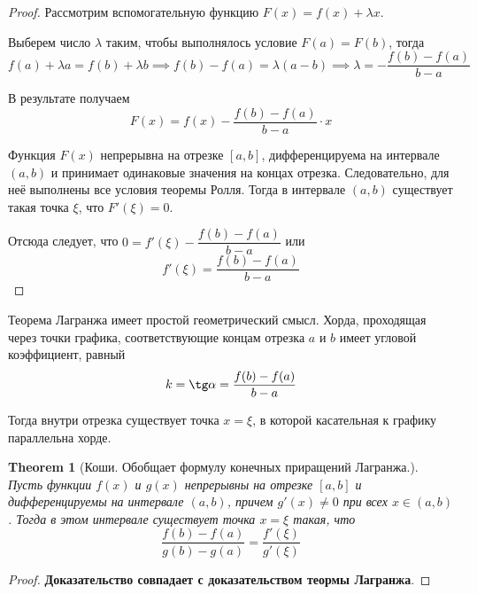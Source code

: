 \documentclass[a4paper]{article}
\theoremstyle{named}
\newtheorem*{namedtheorem}{Theorem}
\begin{document}
\begin{colloq}
		\begin{proof}
			Рассмотрим вспомогательную функцию $F(x) = f(x) + \lambda x$.

			Выберем число $\lambda$ таким, чтобы выполнялось условие $F(a) = F(b)$, тогда
			\begin{equation*}
				f(a) + \lambda a = f(b) + \lambda b 
				\implies f(b) - f(a) = \lambda(a - b) 
				\implies \lambda = -\dfrac{f(b) - f(a)}{b - a}
			\end{equation*}

			В результате получаем
			\begin{equation*}
				F(x) = f(x) - \dfrac{f(b) - f(a)}{b - a} \cdot x
			\end{equation*}

			Функция $F(x)$ непрерывна на отрезке $[a, b]$, дифференцируема на интервале $(a, b)$ и принимает одинаковые значения на концах отрезка. Следовательно, для неё выполнены все условия теоремы Ролля. Тогда в интервале $(a, b)$ существует такая точка $\xi$, что $F'(\xi) = 0$.

			Отсюда следует, что $0 = f'(\xi) - \dfrac{f(b) - f(a)}{b - a}$ или
			\begin{equation*}
				f'(\xi) = \dfrac{f(b) - f(a)}{b - a}
			\end{equation*}
		\end{proof}

		Теорема Лагранжа имеет простой геометрический смысл. Хорда, проходящая через точки графика, соответствующие концам отрезка $a$ и $b$ имеет угловой коэффициент, равный
		\begin{equation*}
			k = \tg \alpha = \dfrac{f(b) - f(a)}{b - a}
		\end{equation*}

		Тогда внутри отрезка существует точка $x = \xi$, в которой касательная к графику параллельна хорде.

		\begin{namedtheorem}[Коши. Обобщает формулу конечных приращений Лагранжа.]
			Пусть функции $f(x)$ и $g(x)$ непрерывны на отрезке $[a, b]$ и дифференцируемы на интервале $(a, b)$, причем $g'(x) \neq 0$ при всех $x \in (a, b)$. Тогда в этом интервале существует точка $x = \xi$ такая, что
			\begin{equation*}
				\dfrac{f(b) - f(a)}{g(b) - g(a)} = \dfrac{f'(\xi)}{g'(\xi)}
			\end{equation*}
		\end{namedtheorem}

		\begin{proof}
			\textbf{Доказательство совпадает с доказательством теормы Лагранжа}.



\end{proof}
\end{colloq}
\end{document}
